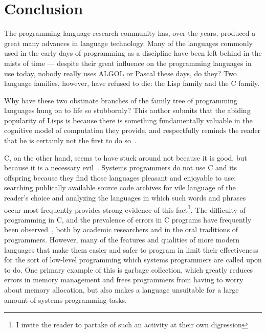 \documentclass[11pt,a4paper]{article}
\theoremstyle{break}
\begin{document}
\vspace*{-.1in}
\section{Conclusion}
\label{sec:conclusion}
\vspace*{-.1in}

The programming language research community has, over the years, produced a great many advances in language technology. Many of the languages commonly used in the early days of programming as a discipline have been left behind in the mists of time --- despite their great influence on the programming languages in use today, nobody really uses ALGOL or Pascal these days, do they? Two language families, however, have refused to die: the Lisp family and the C family.

Why have these two obstinate branches of the family tree of programming languages hung on to life so stubbornly? This author submits that the abiding popularity of Lisps is because there is something fundamentally valuable in the cognitive model of computation they provide, and respectfully reminds the reader that he is certainly not the first to do so~\cite{sicp,raymond2003become}.

C, on the other hand, seems to have stuck around not because it is good, but because it is a necessary evil~\cite{Shapiro:2006:PLC:1215995.1216004}. Systems programmers do not use C and its offspring because they find those languages pleasant and enjoyable to use; searching publically available source code archives for vile language of the reader's choice and analyzing the languages in which such words and phrases occur most frequently provides strong evidence of this fact\footnote{I invite the reader to partake of such an activity at their own digression}. The difficulty of programming in C, and the prevalence of errors in C programs have frequently been observed~\cite{Shapiro:2006:PLC:1215995.1216004,Bhattacharya:2011:APL:1985793.1985817,Ray:2014:LSS:2635868.2635922}, both by academic researchers and in the oral traditions of programmers. However, many of the features and qualities of more modern languages that make them easier and safer to program in limit their effectiveness for the sort of low-level programming which systems programmers are called upon to do. One primary example of this is garbage collection, which greatly reduces errors in memory management and frees programmers from having to worry about memory allocation, but also makes a language unsuitable for a large amount of systems programming tasks.
\end{document}
